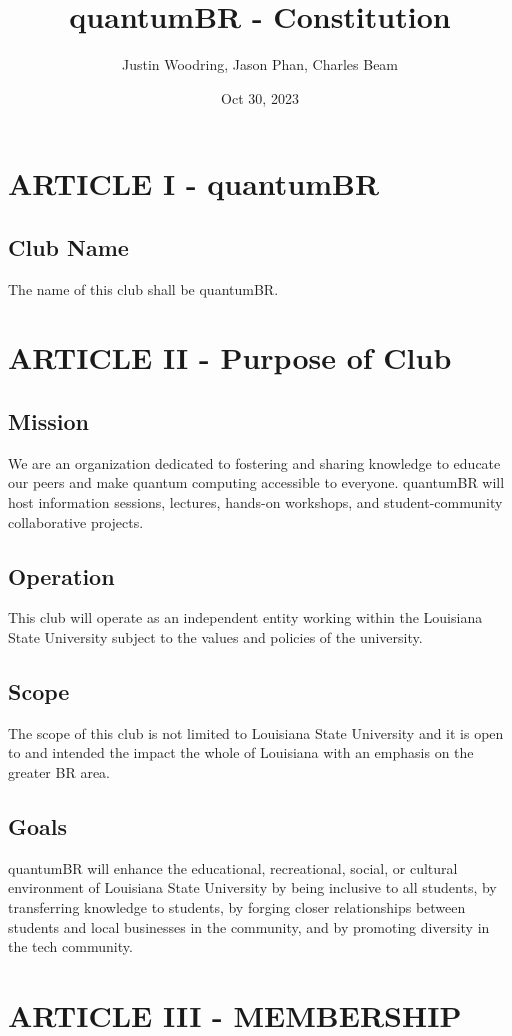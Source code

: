\documentclass[11pt]{amsart}
\title{quantumBR - Constitution}
\author{Justin Woodring, Jason Phan, Charles Beam}
\date{Oct 30, 2023}                                           %
\begin{document}
\maketitle

\section{ARTICLE I - quantumBR} 
\subsection{Club Name}
The name of this club shall be quantumBR.

\section{ARTICLE II - Purpose of Club}
\subsection{Mission}
We are an organization dedicated to fostering and sharing knowledge to educate our peers and make quantum computing accessible to everyone. quantumBR will host information sessions, lectures, hands-on workshops, and student-community collaborative projects.
\subsection{Operation}
This club will operate as an independent entity working within the Louisiana State University subject to the values and policies of the university.
\subsection{Scope}
The scope of this club is not limited to Louisiana State University and it is open to and intended the impact the whole of Louisiana with an emphasis on the greater BR area.
\subsection{Goals}
quantumBR will enhance the educational, recreational, social, or cultural environment of Louisiana State University by being inclusive to all students, by transferring knowledge to students, by forging closer relationships between students and local businesses in the community, and by promoting diversity in the tech community.

\section{ARTICLE III - MEMBERSHIP}
\end{document}
